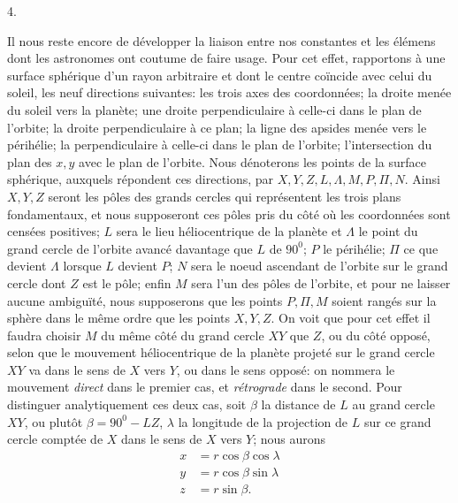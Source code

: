\par{}\bigskip
{}
\begin{center}4.\end{center}
\noindent\hspace*{\parindent}Il nous reste encore de développer la liaison entre nos constantes et les élémens dont les astronomes ont coutume de faire usage. Pour cet effet, rapportons à une surface sphérique d’un rayon arbitraire et dont le centre coïncide avec celui du soleil, les neuf directions suivantes: les trois axes des coordonnées; la droite menée du soleil vers la planète; une droite perpendiculaire à celle-ci dans le plan de l’orbite; la droite perpendiculaire à ce plan; la ligne des apsides menée vers le périhélie; la perpendiculaire à celle-ci dans le plan de l’orbite; l’intersection du plan des \(x,y\) avec le plan de l’orbite. Nous dénoterons les points de la surface sphérique, auxquels répondent ces directions, par \(X,Y,Z,L,\Lambda,M,P,\Pi,N\). Ainsi \(X,Y,Z\) seront les pôles des grands cercles qui représentent les trois plans fondamentaux, et nous supposeront ces pôles pris du côté où les coordonnées sont censées positives; \(L\) sera le lieu héliocentrique de la planète et \(\Lambda\) le point du grand cercle de l’orbite avancé davantage que \(L\) de \(90^{0}\); \(P\) le périhélie; \(\Pi\) ce que devient \(\Lambda\) lorsque \(L\) devient \(P\); \(N\) sera le noeud ascendant de l’orbite sur le grand cercle dont \(Z\) est le pôle; enfin \(M\) sera l’un des pôles de l’orbite, et pour ne laisser aucune ambiguïté, nous supposerons que les points \(P,\Pi,M\) soient rangés sur la sphère dans le même ordre que les points \(X,Y,Z\). On voit que pour cet effet il faudra choisir \(M\) du même côté du grand cercle \(XY\) que \(Z\), ou du côté opposé, selon que le mouvement héliocentrique de la planète projeté sur le grand cercle \(XY\) va dans le sens de \(X\) vers \(Y\), ou dans le sens opposé: on nommera le mouvement \textit{direct} dans le premier cas, et \textit{rétrograde} dans le second. Pour distinguer analytiquement ces deux cas, soit \(\beta\) la distance de \(L\) au grand cercle \(XY\), ou plutôt \(\beta=90^{0}-LZ\), \(\lambda\) la longitude de la projection de \(L\) sur ce grand cercle comptée de \(X\) dans le sens de \(X\) vers \(Y\); nous aurons
\[
\begin{aligned}
x&=r\cos\beta\cos\lambda\\
y&=r\cos\beta\sin\lambda\\
z&=r\sin\beta.
\end{aligned}
\]
